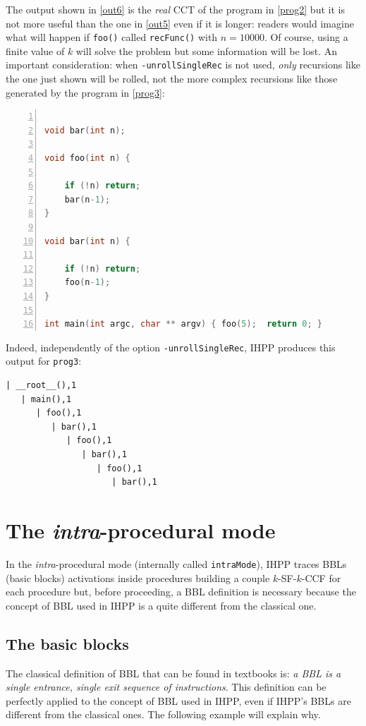 \documentclass[a4paper,11pt]{report}
\begin{document}
\noindent
The output shown in \cref{out6} is the \emph{real} CCT of the program in \cref{prog2} 
but it is not more useful than the one in \cref{out5} even if it is longer: readers
would imagine what will happen if \verb|foo()| called \verb|recFunc()| with $n=10000$. 
Of course, using a finite value of $k$ will solve the problem but some information will be lost. An important consideration: when \verb|-unrollSingleRec| is not used, \emph{only} 
recursions like the one just shown will be rolled, not the more complex recursions like 
those generated by the program in \cref{prog3}:

\begin{lstlisting}[language=C, 
	caption={prog3.c, a program that uses complex recursions}, label=prog3, 
	frame=leftline, numbers=left]

void bar(int n);

void foo(int n) {
	
	if (!n) return;
	bar(n-1);
}

void bar(int n) {

	if (!n) return;
	foo(n-1);
}

int main(int argc, char ** argv) { foo(5);	return 0; }

\end{lstlisting}

\noindent
Indeed, independently of the option \verb|-unrollSingleRec|, 
IHPP produces this output for \verb|prog3|:
\begin{lstlisting}[label=out7, caption={IHPP partial output for \texttt{prog3}},frame=bottomline]
| __root__(),1
   | main(),1
      | foo(),1
         | bar(),1
            | foo(),1
               | bar(),1
                  | foo(),1
                     | bar(),1

\end{lstlisting}


\section{The \emph{intra}-procedural mode}

In the \emph{intra}-procedural mode (internally called \verb|intraMode|), 
IHPP traces BBLs (basic blocks) activations inside procedures building a couple $k$-SF-$k$-CCF for each procedure but, before proceeding, a BBL definition is necessary 
because the concept of BBL used in IHPP is a quite different from the classical one.

\subsection{The basic blocks}
The classical definition of BBL that can be found in textbooks is: \emph{a BBL is a single entrance, single exit sequence of instructions}. 
This definition can be perfectly applied to the concept of BBL used in IHPP, 
even if IHPP's BBLs are different from the classical ones. 
The following example will explain why.
\end{document}
